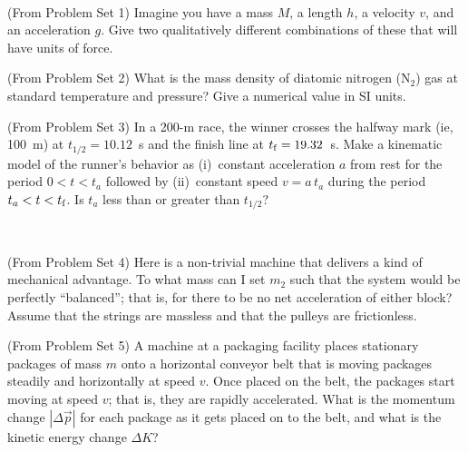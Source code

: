 \documentclass[12pt, letterpaper]{article}
\begin{document}
\vfill
~\clearpage

\begin{problem} (From Problem Set 1)
  Imagine you have a mass $M$, a length $h$, a velocity $v$, and an
  acceleration $g$. Give two qualitatively different combinations of these
  that will have units of force.
\end{problem}

\vfill

\begin{problem} (From Problem Set 2)
  What is the mass density of diatomic nitrogen ($\mathrm{N}_2$) gas at standard
  temperature and pressure? Give a numerical value in SI units.
\end{problem}

\vfill

\begin{problem} (From Problem Set 3)
  In a 200-m race, the winner crosses the halfway mark (ie, 100~m) at
  $t_{1/2}=10.12$~s and the finish line at $t_{\rm f}=19.32$~s.
  Make a kinematic model of the runner's behavior as (i)~constant
  acceleration $a$ from rest for the period $0<t<t_a$ followed by
  (ii)~constant speed $v=a\,t_a$ during the period $t_a<t<t_{\rm f}$.
  Is $t_a$ less than or greater than $t_{1/2}$?
\end{problem}

\vfill
~\clearpage

\begin{problem} (From Problem Set 4)
  Here is a non-trivial machine that delivers a kind of mechanical
  advantage. To what mass can I set $m_2$ such that the system would
  be perfectly ``balanced''; that is, for there to be no
  net acceleration of either block?
  Assume that the strings are massless and that the pulleys are frictionless.
\end{problem}

\vfill

\begin{problem} (From Problem Set 5)
  A machine at a packaging facility places stationary packages of mass
  $m$ onto a horizontal conveyor belt that is moving packages steadily
  and horizontally at speed $v$. Once placed on the belt, the packages
  start moving at speed $v$; that is, they are rapidly accelerated.
  What is the momentum change $|\Delta \vec{p}|$ for each package as it
  gets placed on to the belt, and what is the kinetic energy change $\Delta K$?
\end{problem}
\end{document}
